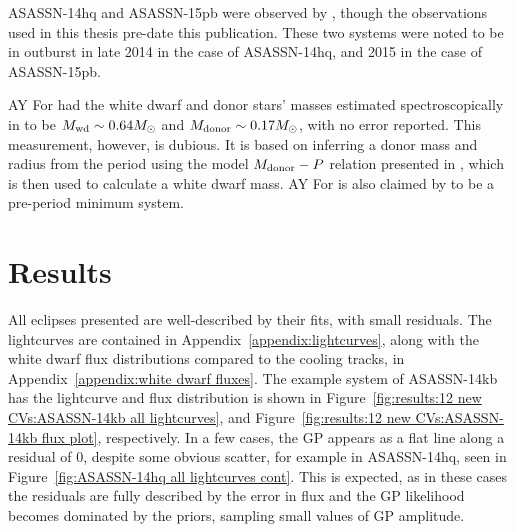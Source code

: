 ASASSN-14hq and ASASSN-15pb were observed by \citet{paterson2019}, though the observations used in this thesis pre-date this publication. These two systems were noted to be in outburst in late 2014 in the case of ASASSN-14hq, and 2015 in the case of ASASSN-15pb.

AY For had the white dwarf and donor stars' masses estimated spectroscopically in \citet{mason2005} to be $M_{\rm wd} \sim 0.64 M_\odot$ and $M_{\rm donor} \sim 0.17 M_\odot$, with no error reported. This measurement, however, is dubious. It is based on inferring a donor mass and radius from the period using the model $M_{\rm donor} - P$ relation presented in \citet{howell2002}, which is then used to calculate a white dwarf mass. AY For is also claimed by \citet{mason2005} to be a pre-period minimum system.


\section{Results}

All eclipses presented are well-described by their fits, with small residuals. The lightcurves are contained in Appendix~\ref{appendix:lightcurves}, along with the white dwarf flux distributions compared to the cooling tracks, in Appendix~\ref{appendix:white dwarf fluxes}. The example system of ASASSN-14kb has the lightcurve and flux distribution is shown in Figure~\ref{fig:results:12 new CVs:ASASSN-14kb all lightcurves}, and Figure~\ref{fig:results:12 new CVs:ASASSN-14kb flux plot}, respectively.
In a few cases, the GP appears as a flat line along a residual of 0, despite some obvious scatter, for example in ASASSN-14hq, seen in Figure~\ref{fig:ASASSN-14hq all lightcurves cont}. This is expected, as in these cases the residuals are fully described by the error in flux and the GP likelihood becomes dominated by the priors, sampling small values of GP amplitude.

